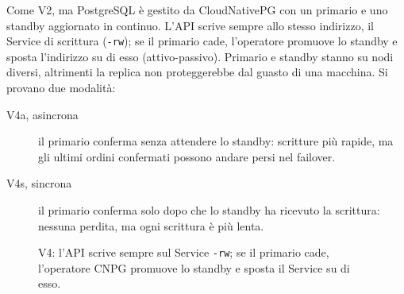 Come V2, ma PostgreSQL è gestito da CloudNativePG con un primario e uno standby aggiornato in continuo. L'API scrive sempre allo stesso indirizzo, il Service di scrittura (\texttt{-rw}); se il primario cade, l'operatore promuove lo standby e sposta l'indirizzo su di esso (attivo-passivo). Primario e standby stanno su nodi diversi, altrimenti la replica non proteggerebbe dal guasto di una macchina. Si provano due modalità:
\begin{description}
  \item[V4a, asincrona] il primario conferma senza attendere lo standby: scritture più rapide, ma gli ultimi ordini confermati possono andare persi nel failover.
  \item[V4s, sincrona] il primario conferma solo dopo che lo standby ha ricevuto la scrittura: nessuna perdita, ma ogni scrittura è più lenta.
\end{description}

\begin{figure}[H]
\centering
{}
\caption{V4: l'API scrive sempre sul Service \texttt{-rw}; se il primario cade, l'operatore CNPG promuove lo standby e sposta il Service su di esso.}
\label{fig:v4}
\end{figure}

